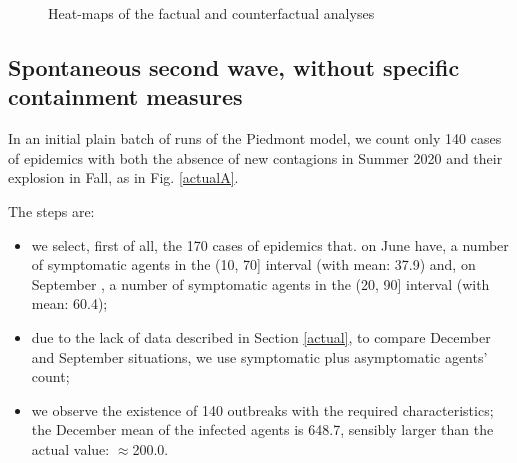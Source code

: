 \documentclass[graybox]{svmult}
\begin{document}
\begin{figure}[t]
\begin{subfigure}{0.48\textwidth}
 \label{secondFromOutNoFrag}
 \end{subfigure}
 \caption{Heat-maps of the factual and counterfactual analyses}
 \label{casesHeatM}
\end{figure}



\subsection{Spontaneous second wave, without specific containment measures}
\label{spont}

In an initial plain batch of runs of the Piedmont model, we count only 140 cases of epidemics with both the absence of new contagions in Summer 2020 and their explosion in Fall, as in Fig. \ref{actualA}.

The steps are:
\begin{itemize}

\item we select, first of all, the 170 cases of epidemics that. on June  have, a number of symptomatic agents in the (10, 70] interval (with mean: 37.9) and, on September , a number of symptomatic agents in the (20, 90] interval (with mean: 60.4);

\item due to the lack of data described in Section \ref{actual}, to compare December  and September  situations, we use symptomatic plus asymptomatic agents' count;

\item we observe the existence of 140 outbreaks with the required characteristics; the December mean of the infected agents is 648.7, sensibly larger than the actual value: $\approx$200.0. 

\end{itemize}
\end{document}

